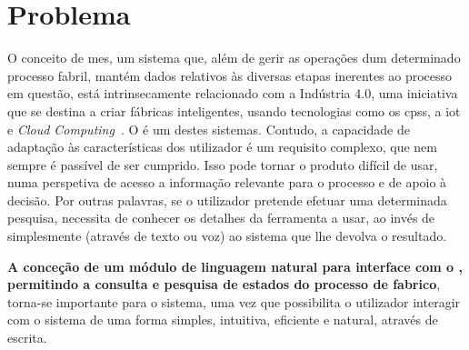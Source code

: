 \section{Problema}
\label{sec:chap01_problem}
O conceito de \gls{mes}, um sistema que, além de gerir as operações dum determinado processo fabril, mantém dados relativos às diversas etapas inerentes ao processo em questão, está intrinsecamente relacionado com a Indústria 4.0, uma iniciativa que se destina a criar fábricas inteligentes, usando tecnologias como os \glspl{cps}, a \gls{iot} e \textit{Cloud Computing}~\parencite{intelligent_manufacturing_context_industry40_review}. O {\productname} é um destes sistemas. Contudo, a capacidade de adaptação às características dos utilizador é um requisito complexo, que nem sempre é passível de ser cumprido. Isso pode tornar o produto difícil de usar, numa perspetiva de acesso a informação relevante para o processo e de apoio à decisão. Por outras palavras, se o utilizador pretende efetuar uma determinada pesquisa, necessita de conhecer os detalhes da ferramenta a usar, ao invés de simplesmente  (através de texto ou voz) ao sistema que lhe devolva o resultado.

\textbf{A conceção de um módulo de linguagem natural para interface com o {\productname}, permitindo a consulta e pesquisa de estados do processo de fabrico}, torna-se importante para o sistema, uma vez que possibilita o utilizador interagir com o sistema de uma forma simples, intuitiva, eficiente e natural, através de escrita.